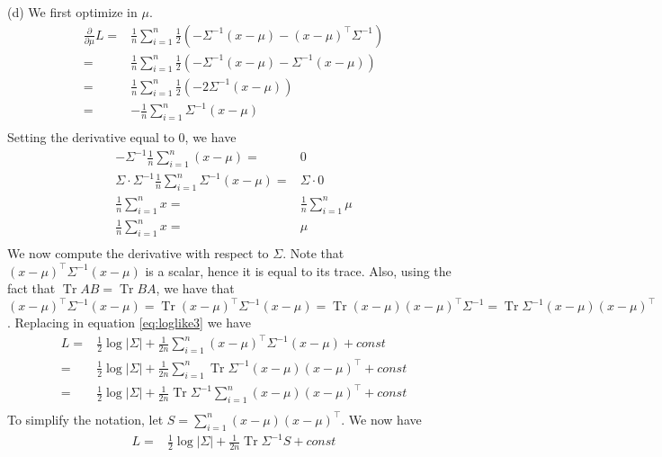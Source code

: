 \documentclass[12pt,english]{amsart}
\theoremstyle{definition}
\DeclareMathOperator{\Tr}{Tr}
\begin{document}
(d) We first optimize in $\mu$. 
\begin{equation}
\begin{split}
   \frac{\partial}{\partial \mu} L
=& \frac{1}{n} \sum_{i=1}^{n} \frac{1}{2}\left(-\Sigma^{-1}(x-\mu)- (x-\mu)^\top \Sigma^{-1} \right)\\
=& \frac{1}{n} \sum_{i=1}^{n} \frac{1}{2}\left(-\Sigma^{-1}(x-\mu)- \Sigma^{-1}(x-\mu) \right)\\
=& \frac{1}{n} \sum_{i=1}^{n} \frac{1}{2}\left(-2\Sigma^{-1}(x-\mu) \right)\\
=& -\frac{1}{n} \sum_{i=1}^{n}\Sigma^{-1}(x-\mu) \\
\end{split}
\end{equation}
Setting the derivative equal to 0, we have
\begin{equation}
\begin{split}
 -\Sigma^{-1}\frac{1}{n} \sum_{i=1}^{n}(x-\mu)=&0 \\
\Sigma\cdot \Sigma^{-1}\frac{1}{n} \sum_{i=1}^{n}\Sigma^{-1}(x-\mu)=&\Sigma \cdot 0 \\
\frac{1}{n} \sum_{i=1}^{n}x=& \frac{1}{n} \sum_{i=1}^{n}\mu \\
\frac{1}{n} \sum_{i=1}^{n}x=& \mu \\
\end{split}
\end{equation}
We now compute the derivative with respect to $\Sigma$. Note that $(x-\mu)^\top\Sigma^{-1}(x-\mu)$ is a scalar, hence it is equal to its trace. Also, using the fact that $\Tr AB = \Tr BA$, we have that  $(x-\mu)^\top\Sigma^{-1}(x-\mu)=\Tr (x-\mu)^\top\Sigma^{-1}(x-\mu)=\Tr (x-\mu)(x-\mu)^\top\Sigma^{-1}=\Tr \Sigma^{-1}(x-\mu)(x-\mu)^\top$. Replacing in equation \ref{eq:loglike3} we have
\begin{equation}
\begin{split}
    L 
=& \frac{1}{2}\log|\Sigma| + \frac{1}{2n}\sum_{i=1}^n(x-\mu)^\top\Sigma^{-1}(x-\mu) + const\\
=& \frac{1}{2}\log|\Sigma| + \frac{1}{2n}\sum_{i=1}^n\Tr \Sigma^{-1}(x-\mu)(x-\mu)^\top + const\\
=& \frac{1}{2}\log|\Sigma| + \frac{1}{2n}\Tr\Sigma^{-1}\sum_{i=1}^n(x-\mu)(x-\mu)^\top + const\\
\end{split}
\label{eq:loglike4}
\end{equation}
To simplify the notation, let $S=\sum_{i=1}^n(x-\mu)(x-\mu)^\top$. We now have
\begin{equation}
\begin{split}
    L 
=& \frac{1}{2}\log|\Sigma| + \frac{1}{2n}\Tr\Sigma^{-1}S + const\\
\end{split}
\label{eq:loglike5}
\end{equation}
\end{document}
